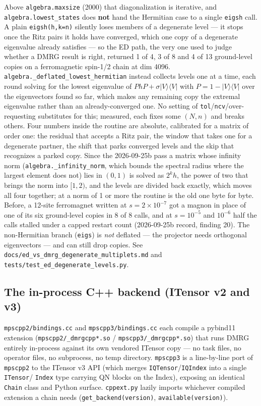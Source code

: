 \documentclass[11pt]{article}
\begin{document}
Above \texttt{algebra.maxsize} (2000) that diagonalization is iterative, and
\texttt{algebra.lowest\_states} does \textbf{not} hand the Hermitian case to
a single \texttt{eigsh} call. A plain \texttt{eigsh(h,k=n)} silently loses
members of a degenerate level --- it stops once the Ritz pairs it holds have
converged, which one copy of a degenerate eigenvalue already satisfies --- so
the ED path, the very one used to judge whether a DMRG result is right,
returned 1 of 4, 3 of 8 and 4 of 13 ground-level copies on a ferromagnetic
spin-1/2 chain at dim 4096. \texttt{algebra.\_deflated\_lowest\_hermitian}
instead collects levels one at a time, each round solving for the lowest
eigenvalue of $PhP + \sigma|V\rangle\langle V|$ with
$P = 1 - |V\rangle\langle V|$ over the eigenvectors found so far, which makes
any remaining copy the extremal eigenvalue rather than an already-converged
one. No setting of \texttt{tol}/\texttt{ncv}/over-requesting substitutes for
this; measured, each fixes some $(N,n)$ and breaks others. Four numbers
inside the routine are absolute, calibrated for a matrix of order one: the
residual that accepts a Ritz pair, the window that takes one for a
degenerate partner, the shift that parks converged levels and the skip
that recognizes a parked copy. Since the 2026-09-25b pass a matrix whose
infinity norm (\texttt{algebra.\_infinity\_norm}, which bounds the spectral
radius where the largest element does not) lies in $(0,1)$ is solved as
$2^kh$, the power of two that brings the norm into $[1,2)$, and the levels
are divided back exactly, which moves all four together; at a norm of 1 or
more the routine is the old one byte for byte. Before, a 12-site
ferromagnet written at $s=2\times10^{-7}$ got a magnon in place of one of
its six ground-level copies in 8 of 8 calls, and at $s=10^{-5}$ and
$10^{-6}$ half the calls stalled under a capped restart count (2026-09-25b
record, finding 20). The non-Hermitian
branch (\texttt{eigs}) is \emph{not} deflated --- the projector needs
orthogonal eigenvectors --- and can still drop copies. See
\texttt{docs/ed\_vs\_dmrg\_degenerate\_multiplets.md} and
\texttt{tests/test\_ed\_degenerate\_levels.py}.

\subsection{The in-process C++ backend (ITensor v2 and v3)}

\texttt{mpscpp2/bindings.cc} and \texttt{mpscpp3/bindings.cc} each
compile a pybind11 extension (\texttt{mpscpp2/\_dmrgcpp*.so} /
\texttt{mpscpp3/\_dmrgcpp*.so}) that runs DMRG entirely in-process against
its own vendored ITensor copy --- no task files, no operator files, no
subprocess, no temp directory. \texttt{mpscpp3} is a line-by-line port of
\texttt{mpscpp2} to the ITensor v3 API (which merges
\texttt{IQTensor}/\texttt{IQIndex} into a single \texttt{ITensor}/
\texttt{Index} type carrying QN blocks on the Index), exposing an
identical \texttt{Chain} class and Python surface. \texttt{cppext.py}
lazily imports whichever compiled extension a chain needs
(\texttt{get\_backend(version)}, \texttt{available(version)}).
\end{document}
